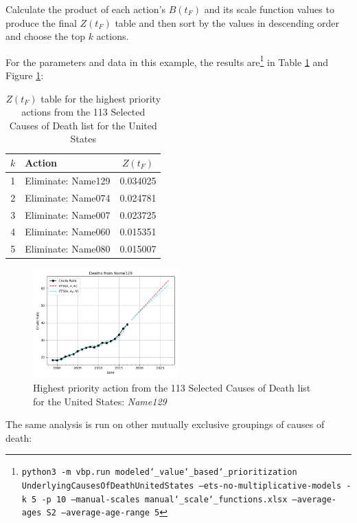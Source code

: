 \documentclass[12pt, a4paper, twocolumn]{article}
\begin{document}
Calculate the product of each action's $B(t_F)$ and its scale function values to produce the final $Z(t_F)$ table and then sort by the values in descending order and choose the top $k$ actions.

For the parameters and data in this example, the results are\footnote{\texttt{python3 -m vbp.run modeled\char`_value\char`_based\char`_prioritization UnderlyingCausesOfDeathUnitedStates --ets-no-multiplicative-models -k 5 -p 10 --manual-scales manual\char`_scale\char`_functions.xlsx --average-ages S2 --average-age-range 5}} in Table \ref{table:ztable1} and Figure \ref{fig:k1}:

\begin{table}[H]
  \centering
  \begin{tabular}{clc}
    \toprule
      $k$ & Action             & $Z(t_F)$ \\
    \midrule
      1   & Eliminate: Name129 & 0.034025 \\
      2   & Eliminate: Name074 & 0.024781 \\
      3   & Eliminate: Name007 & 0.023725 \\
      4   & Eliminate: Name060 & 0.015351 \\
      5   & Eliminate: Name080 & 0.015007 \\
    \bottomrule
  \end{tabular}
  \caption{$Z(t_F)$ table for the highest priority actions from the 113 Selected Causes of Death list for the United States}
  \label{table:ztable1}
\end{table}

\begin{figure}[H]
  \centering
  \includegraphics[width=0.5\textwidth]{results/US_ICD10_113_SELECTED_CAUSES_LEAVES/Name129_ets.png}
  \caption{Highest priority action from the 113 Selected Causes of Death list for the United States: \textit{Name129}}\label{fig:k1}
\end{figure}

The same analysis is run on other mutually exclusive groupings of causes of death:
\end{document}
